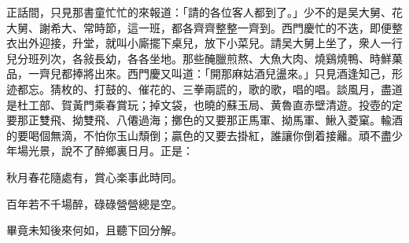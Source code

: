正話間，只見那書童忙忙的來報道：「請的各位客人都到了。」少不的是吴大舅、花大舅、謝希大、常時節，這一班，都各齊齊整整一齊到。西門慶忙的不迭，即便整衣出外迎接，升堂，就叫小廝擺下桌兒，放下小菜兒。請吴大舅上坐了，衆人一行兒分班列次，各敍長幼，各各坐地。那些醃臘煎熬、大魚大肉、燒鷄燒鴨、時鮮菓品，一齊兒都捧將出來。西門慶又叫道：「開那麻姑酒兒盪來。」只見酒逢知己，形迹都忘。猜枚的、打鼓的、催花的、三拳兩謊的，歌的歌，唱的唱。談風月，盡道是杜工部、賀黃門乘春賞玩；掉文袋，也曉的蘇玉局、黄魯直赤壁清遊。投壺的定要那正雙飛、拗雙飛、八僊過海；擲色的又要那正馬軍、拗馬軍、鰍入菱窠。輸酒的要喝個無滴，不怕你玉山頹倒；贏色的又要去掛紅，誰讓你倒着接䍦。頑不盡少年場光景，說不了醉鄉裏日月。正是：

秋月春花隨處有，賞心楽事此時同。

百年若不千場醉，碌碌營營總是空。

畢竟未知後來何如，且聽下回分解。

